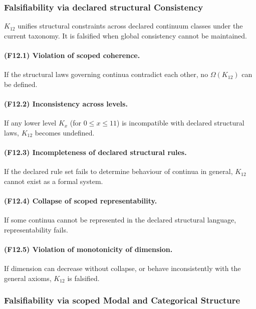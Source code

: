 \subsubsection{Falsifiability via declared structural Consistency}

$K_{12}$ unifies structural constraints across declared continuum classes under the current taxonomy.
It is falsified when global consistency cannot be maintained.

\paragraph{(F12.1) Violation of scoped coherence.}
If the structural laws governing continua contradict each other,
no $\Omega(K_{12})$ can be defined.

\paragraph{(F12.2) Inconsistency across levels.}
If any lower level $K_x$ (for $0 \le x \le 11$) is incompatible with
declared structural laws, $K_{12}$ becomes undefined.

\paragraph{(F12.3) Incompleteness of declared structural rules.}
If the declared rule set fails to determine behaviour of continua
in general, $K_{12}$ cannot exist as a formal system.

\paragraph{(F12.4) Collapse of scoped representability.}
If some continua cannot be represented in the declared structural
language, representability fails.

\paragraph{(F12.5) Violation of monotonicity of dimension.}
If dimension can decrease without collapse, or behave inconsistently
with the general axioms, $K_{12}$ is falsified.



\subsubsection{Falsifiability via scoped Modal and Categorical Structure}

